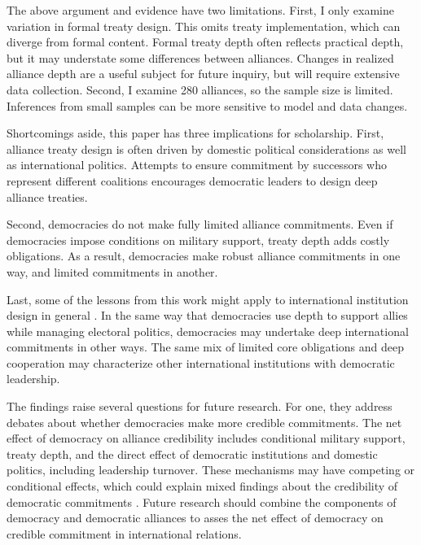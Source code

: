 \documentclass[12pt]{article}
\begin{document}
The above argument and evidence have two limitations.
First, I only examine variation in formal treaty design. 
This omits treaty implementation, which can diverge from formal content.   
Formal treaty depth often reflects practical depth, but it may understate some differences between alliances. 
Changes in realized alliance depth are a useful subject for future inquiry, but will require extensive data collection.
Second, I examine 280 alliances, so the sample size is limited. 
Inferences from small samples can be more sensitive to model and data changes. 


Shortcomings aside, this paper has three implications for scholarship. 
First, alliance treaty design is often driven by domestic political considerations as well as international politics. 
Attempts to ensure commitment by successors who represent different coalitions encourages democratic leaders to design deep alliance treaties. 

Second, democracies do not make fully limited alliance commitments.
Even if democracies impose conditions on military support, treaty depth adds costly obligations.
As a result, democracies make robust alliance commitments in one way, and limited commitments in another. 


Last, some of the lessons from this work might apply to international institution design in general \citep{DownesRocke1995, MartinSimmons1998, Koremenosetal2001, Thompson2010}.
In the same way that democracies use depth to support allies while managing electoral politics, democracies may undertake deep international commitments in other ways. 
The same mix of limited core obligations and deep cooperation may characterize other international institutions with democratic leadership. 


The findings raise several questions for future research.  
For one, they address debates about whether democracies make more credible commitments. 
The net effect of democracy on alliance credibility includes conditional military support, treaty depth, and the direct effect of democratic institutions and domestic politics, including leadership turnover. 
These mechanisms may have competing or conditional effects, which could explain mixed findings about the credibility of democratic commitments \citep{Schultz1999, Leeds1999, Thyne2012, DownesSechser2012, PotterBaum2014}.
Future research should combine the components of democracy and democratic alliances to asses the net effect of democracy on credible commitment in international relations. 
\end{document}
